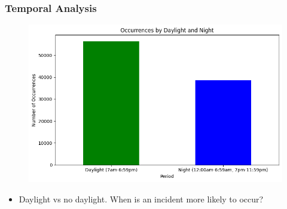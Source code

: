 \documentclass{beamer}
\begin{document}
\begin{frame}
    \frametitle{Temporal Analysis}
    \begin{figure}
        \flushleft
        \includegraphics[width=1\linewidth]{Figures/Daylight_and_Night.png}
    \end{figure}
    {\scriptsize %
    \begin{itemize}
        \item  Daylight vs no daylight. When is an incident more likely to occur?
    \end{itemize}
    }
\end{frame}

\end{document}

